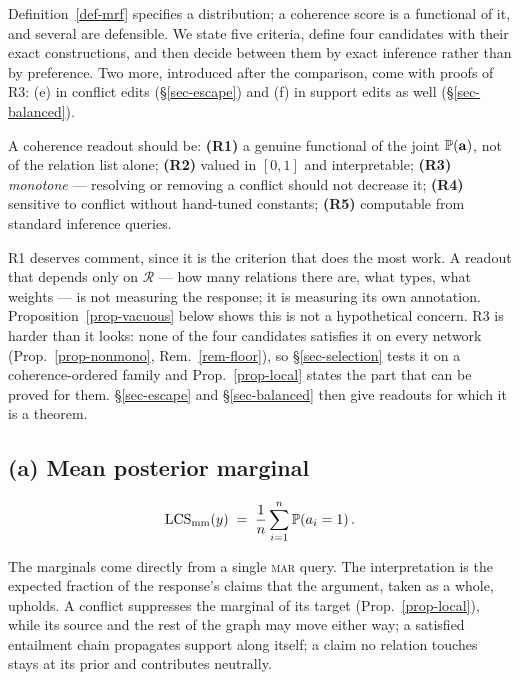 Definition~\ref{def-mrf} specifies a distribution; a coherence score is a functional of it, and
several are defensible. We state five criteria, define four candidates with their exact
constructions, and then decide between them by exact inference rather than by preference. Two more,
introduced after the comparison, come with proofs of R3: (e) in conflict edits (\S\ref{sec-escape})
and (f) in support edits as well (\S\ref{sec-balanced}).

\begin{definition}[Criteria]
\label{def-criteria}
A coherence readout should be:
\textbf{(R1)} a genuine functional of the joint $\mathbb{P}\!\left( \mathbf{a} \right)$, not of the relation list alone;
\textbf{(R2)} valued in $[0,1]$ and interpretable;
\textbf{(R3)} \emph{monotone} --- resolving or removing a conflict should not decrease it;
\textbf{(R4)} sensitive to conflict without hand-tuned constants;
\textbf{(R5)} computable from standard inference queries.
\end{definition}

R1 deserves comment, since it is the criterion that does the most work. A readout that depends only
on $\mathcal{R}$ --- how many relations there are, what types, what weights --- is not measuring the
response; it is measuring its own annotation. Proposition~\ref{prop-vacuous} below shows this is not
a hypothetical concern. R3 is harder than it looks: none of the four candidates satisfies it on every network
(Prop.~\ref{prop-nonmono}, Rem.~\ref{rem-floor}), so \S\ref{sec-selection} tests it on a
coherence-ordered family and Prop.~\ref{prop-local} states the part that can be proved for them.
\S\ref{sec-escape} and \S\ref{sec-balanced} then give readouts for which it is a theorem.

\subsection{(a) Mean posterior marginal}

\begin{equation}
\mathrm{LCS}_{\mathrm{mm}}(y) \;=\; \frac{1}{n}\sum_{i=1}^{n}\mathbb{P}\!\left( a_i=1 \right) .
\label{eq-mm}
\end{equation}

The marginals come directly from a single \textsc{mar} query. The interpretation is the expected
fraction of the response's claims that the argument, taken as a whole, upholds. A conflict
suppresses the marginal of its target (Prop.~\ref{prop-local}), while its source and the rest of the
graph may move either way; a satisfied entailment chain propagates support along itself; a claim no
relation touches stays at its prior and contributes neutrally.

